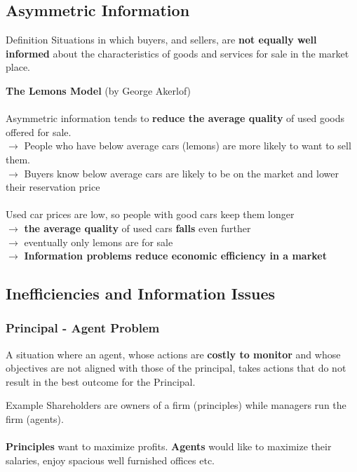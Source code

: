 \subsection{Asymmetric Information}
\begin{note}{Definition}
	Situations in which buyers, and sellers, are \textbf{not equally well informed} about the characteristics of goods and services for sale in the market place.
\end{note}
\textbf{The Lemons Model} (by George Akerlof)\\\\
Asymmetric information tends to \textbf{reduce the average quality} of used goods offered for sale.\\
$\rightarrow$ People who have below average cars (lemons) are more likely to want to sell them.\\
$\rightarrow$ Buyers know below average cars are likely to be on the market and lower their reservation price\\\\
Used car prices are low, so people with good cars keep them longer\\
$\rightarrow$ \textbf{the average quality} of used cars \textbf{falls} even further\\
$\rightarrow$ eventually only lemons are for sale\\
$\rightarrow$ \textbf{Information problems reduce economic efficiency in a market}

\subsection{Inefficiencies and Information Issues}
\subsubsection{Principal - Agent Problem}
A situation where an agent, whose actions are \textbf{costly to monitor} and whose objectives are not aligned with those of the principal, takes actions that do not result in the best outcome for the Principal.
\begin{note}{Example}
	Shareholders are owners of a firm (principles) while managers run the firm (agents).\\\\
	\textbf{Principles} want to maximize profits. \textbf{Agents} would like to maximize their salaries, enjoy spacious well furnished offices etc.
\end{note}

